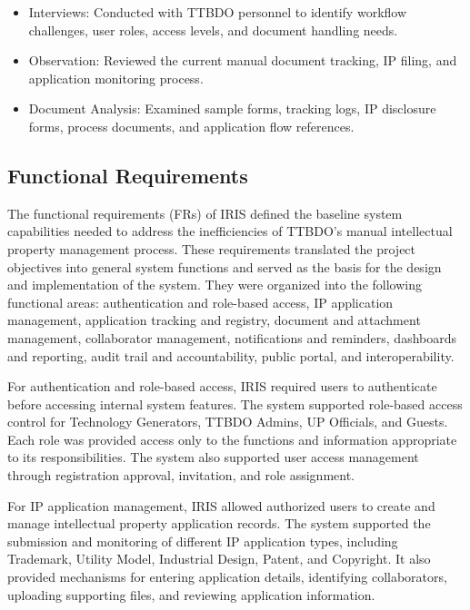 \begin{itemize}
  \item Interviews: Conducted with TTBDO personnel to identify workflow challenges, user roles, access levels, and document handling needs.
  \item Observation: Reviewed the current manual document tracking, IP filing, and application monitoring process.
  \item Document Analysis: Examined sample forms, tracking logs, IP disclosure forms, process documents, and application flow references.
\end{itemize}

\subsection{Functional Requirements}

The functional requirements (FRs) of IRIS defined the baseline system capabilities needed to address the inefficiencies of TTBDO's manual intellectual property management process. These requirements translated the project objectives into general system functions and served as the basis for the design and implementation of the system. They were organized into the following functional areas: authentication and role-based access, IP application management, application tracking and registry, document and attachment management, collaborator management, notifications and reminders, dashboards and reporting, audit trail and accountability, public portal, and interoperability.

For authentication and role-based access, IRIS required users to authenticate before accessing internal system features. The system supported role-based access control for Technology Generators, TTBDO Admins, UP Officials, and Guests. Each role was provided access only to the functions and information appropriate to its responsibilities. The system also supported user access management through registration approval, invitation, and role assignment.

For IP application management, IRIS allowed authorized users to create and manage intellectual property application records. The system supported the submission and monitoring of different IP application types, including Trademark, Utility Model, Industrial Design, Patent, and Copyright. It also provided mechanisms for entering application details, identifying collaborators, uploading supporting files, and reviewing application information.

